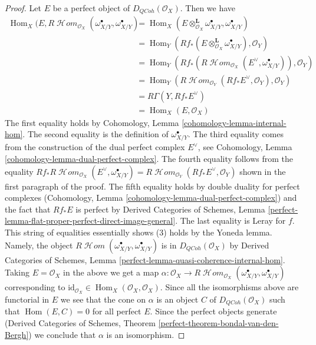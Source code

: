 \documentclass{stacks-project}
\theoremstyle{plain}
\theoremstyle{definition}
\theoremstyle{remark}
\numberwithin{equation}{subsection}
\def\Hom{\mathop{\mathrm{Hom}}\nolimits}
\def\SheafHom{\mathop{\mathcal{H}\!\mathit{om}}\nolimits}
\def\QCoh{\mathit{QCoh}}
\begin{document}
\begin{proof}
\medskip\noindent
Let $E$ be a perfect object of $D_\QCoh(\mathcal{O}_X)$. Then
we have
\begin{align*}
\Hom_X(E, R\SheafHom_{\mathcal{O}_X}(\omega_{X/Y}^\bullet, \omega_{X/Y}^\bullet)
& =
\Hom_X(E \otimes_{\mathcal{O}_X}^\mathbf{L} \omega_{X/Y}^\bullet,
\omega_{X/Y}^\bullet) \\
& =
\Hom_Y(Rf_*(E \otimes_{\mathcal{O}_X}^\mathbf{L} \omega_{X/Y}^\bullet),
\mathcal{O}_Y) \\
& =
\Hom_Y(Rf_*(R\SheafHom_{\mathcal{O}_X}(E^\vee, \omega_{X/Y}^\bullet)),
\mathcal{O}_Y) \\
& =
\Hom_Y(R\SheafHom_{\mathcal{O}_Y}(Rf_*E^\vee, \mathcal{O}_Y),
\mathcal{O}_Y) \\
& =
R\Gamma(Y, Rf_*E^\vee) \\
& =
\Hom_X(E, \mathcal{O}_X)
\end{align*}
The first equality holds by Cohomology, Lemma
\ref{cohomology-lemma-internal-hom}.
The second equality is the definition of $\omega_{X/Y}^\bullet$.
The third equality comes from the construction of the dual perfect
complex $E^\vee$, see Cohomology, Lemma
\ref{cohomology-lemma-dual-perfect-complex}.
The fourth equality follows from the equality
$Rf_*R\SheafHom_{\mathcal{O}_X}(E^\vee, \omega_{X/Y}^\bullet) =
R\SheafHom_{\mathcal{O}_Y}(Rf_*E^\vee, \mathcal{O}_Y)$
shown in the first paragraph of the proof.
The fifth equality holds by double duality for perfect complexes
(Cohomology, Lemma
\ref{cohomology-lemma-dual-perfect-complex})
and the fact that $Rf_*E$ is perfect by
Derived Categories of Schemes, Lemma
\ref{perfect-lemma-flat-proper-perfect-direct-image-general}.
The last equality is Leray for $f$.
This string of equalities essentially shows (3)
holds by the Yoneda lemma. Namely, the object
$R\SheafHom(\omega_{X/Y}^\bullet, \omega_{X/Y}^\bullet)$
is in $D_\QCoh(\mathcal{O}_X)$ by Derived Categories of Schemes, Lemma
\ref{perfect-lemma-quasi-coherence-internal-hom}.
Taking $E = \mathcal{O}_X$ in the above we get a map
$\alpha : \mathcal{O}_X \to
R\SheafHom_{\mathcal{O}_X}(\omega_{X/Y}^\bullet, \omega_{X/Y}^\bullet)$
corresponding to
$\text{id}_{\mathcal{O}_X} \in \Hom_X(\mathcal{O}_X, \mathcal{O}_X)$.
Since all the isomorphisms above are functorial in $E$ we
see that the cone on $\alpha$ is an object $C$ of $D_\QCoh(\mathcal{O}_X)$
such that $\Hom(E, C) = 0$ for all perfect $E$.
Since the perfect objects generate
(Derived Categories of Schemes, Theorem
\ref{perfect-theorem-bondal-van-den-Bergh})
we conclude that $\alpha$ is an isomorphism.
\end{proof}
\end{document}
